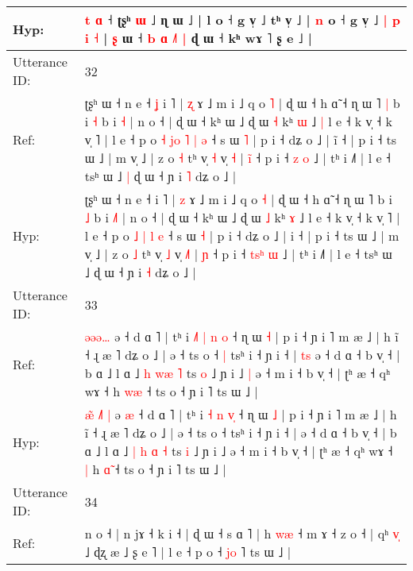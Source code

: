 \documentclass[10pt]{article}
\DeclareRobustCommand{\hl}[1]{{\textcolor{red}{#1}}}
\begin{document}
\begin{longtable}{ll}
Hyp: & \hl{t} \hl{ɑ} ˧\hl{}\hl{}\hl{}\hl{}\hl{}\hl{} ʈʂʰ \hl{ɯ} ˩ ɳ ɯ ˩ | l o ˧ g v̩ ˩ tʰ v̩ ˩ | \hl{n} o ˧ g v̩ ˩ \hl{|}\hl{ }\hl{p}\hl{ }\hl{i} \hl{˧} | \hl{ʂ} ɯ ˧\hl{ }\hl{b} \hl{ɑ} \hl{˩}\hl{˥}\hl{ }\hl{|} ɖ ɯ ˧ kʰ wɤ ˥ ʂ e ˩ |
 \\
\midrule
Utterance ID: & 32 \\
Ref: & ʈʂʰ ɯ ˧ n e ˧\hl{ }\hl{ʝ} i ˥ | \hl{ʐ} ɤ ˩ m i ˩ q o \hl{˥} | ɖ ɯ ˧ h ɑ̃ ˧ ɳ ɯ ˥\hl{ }\hl{|} b i \hl{˧} b i \hl{}\hl{˧} | n o ˧ | ɖ ɯ ˧ kʰ ɯ ˩ ɖ ɯ \hl{˧} kʰ \hl{ɯ} ˩\hl{ }\hl{|} l e ˧ k v̩ ˧ k v̩ ˥ | l e ˧ p o\hl{ }\hl{˧} \hl{j}\hl{o} \hl{˥} \hl{|} \hl{ə} ˧ s ɯ \hl{˥} | p i ˧ dʑ o ˩ | i\hl{̃} ˧ | p i ˧ ts ɯ ˩ | m v̩ ˩ | z o \hl{˧} tʰ v̩ \hl{˧} v̩ \hl{}\hl{˧} | \hl{i}\hl{̃} ˧ p i ˧ \hl{}\hl{}\hl{z} \hl{o} ˩ | tʰ i ˩˥ | l e ˧ tsʰ ɯ ˩\hl{ }\hl{|} ɖ ɯ ˧ ɲ i \hl{˥} dʑ o ˩ |
 \\
Hyp: & ʈʂʰ ɯ ˧ n e ˧\hl{}\hl{} i ˥ | \hl{z} ɤ ˩ m i ˩ q o \hl{˧} | ɖ ɯ ˧ h ɑ̃ ˧ ɳ ɯ ˥\hl{}\hl{} b i \hl{˩} b i \hl{˩}\hl{˥} | n o ˧ | ɖ ɯ ˧ kʰ ɯ ˩ ɖ ɯ \hl{˩} kʰ \hl{ɤ} ˩\hl{}\hl{} l e ˧ k v̩ ˧ k v̩ ˥ | l e ˧ p o\hl{}\hl{} \hl{}\hl{˩} \hl{|} \hl{l} \hl{e} ˧ s ɯ \hl{˧} | p i ˧ dʑ o ˩ | i\hl{} ˧ | p i ˧ ts ɯ ˩ | m v̩ ˩ | z o \hl{˩} tʰ v̩ \hl{˩} v̩ \hl{˩}\hl{˥} | \hl{}\hl{ɲ} ˧ p i ˧ \hl{t}\hl{s}\hl{ʰ} \hl{ɯ} ˩ | tʰ i ˩˥ | l e ˧ tsʰ ɯ ˩\hl{}\hl{} ɖ ɯ ˧ ɲ i \hl{˧} dʑ o ˩ |
 \\
\midrule
Utterance ID: & 33 \\
Ref: & \hl{}\hl{}\hl{}\hl{ə}\hl{ə}\hl{ə}\hl{…} ə\hl{}\hl{} ˧ d ɑ ˥ | tʰ i \hl{˩}\hl{˥} \hl{|} \hl{n}\hl{ }\hl{o} ˧ ɳ ɯ \hl{˧} | p i ˧ ɲ i ˥ m æ ˩ | h ĩ ˧ ɻ æ ˥ dʑ o ˩ | ə ˧ ts o ˧\hl{ }\hl{|} tsʰ i ˧ ɲ i ˧ |\hl{ }\hl{t}\hl{s} ə ˧ d ɑ ˧ b v̩ ˧ | b ɑ ˩ l ɑ ˩ \hl{h} \hl{}\hl{w}\hl{æ} \hl{˥} ts \hl{o} ˩ ɲ i ˩\hl{ }\hl{|} ə ˧ m i ˧ b v̩ ˧ | ʈʰ æ ˧ qʰ wɤ ˧\hl{}\hl{} h \hl{w}\hl{æ} ˧ ts o ˧ ɲ i ˥ ts ɯ ˩ |
 \\
Hyp: & \hl{æ}\hl{̃}\hl{ }\hl{˩}\hl{˥}\hl{ }\hl{|} ə\hl{ }\hl{æ} ˧ d ɑ ˥ | tʰ i \hl{}\hl{˧} \hl{n} \hl{}\hl{v}\hl{̩} ˧ ɳ ɯ \hl{˩} | p i ˧ ɲ i ˥ m æ ˩ | h ĩ ˧ ɻ æ ˥ dʑ o ˩ | ə ˧ ts o ˧\hl{}\hl{} tsʰ i ˧ ɲ i ˧ |\hl{}\hl{}\hl{} ə ˧ d ɑ ˧ b v̩ ˧ | b ɑ ˩ l ɑ ˩ \hl{|} \hl{h}\hl{ }\hl{ɑ} \hl{˧} ts \hl{i} ˩ ɲ i ˩\hl{}\hl{} ə ˧ m i ˧ b v̩ ˧ | ʈʰ æ ˧ qʰ wɤ ˧\hl{ }\hl{|} h \hl{ɑ}\hl{̃} ˧ ts o ˧ ɲ i ˥ ts ɯ ˩ |
 \\
\midrule
Utterance ID: & 34 \\
Ref: & n o ˧ | n jɤ ˧ k i ˧ | ɖ ɯ ˧ s ɑ ˥ | h \hl{w}\hl{æ} ˧ m ɤ ˧ z o ˧ | qʰ \hl{v}\hl{̩} ˩ ɖʐ æ ˩ ʂ e ˥ | l e ˧ p o ˧ \hl{j}\hl{o} ˥ ts ɯ ˩ |
 \\

\end{longtable}
\end{document}

